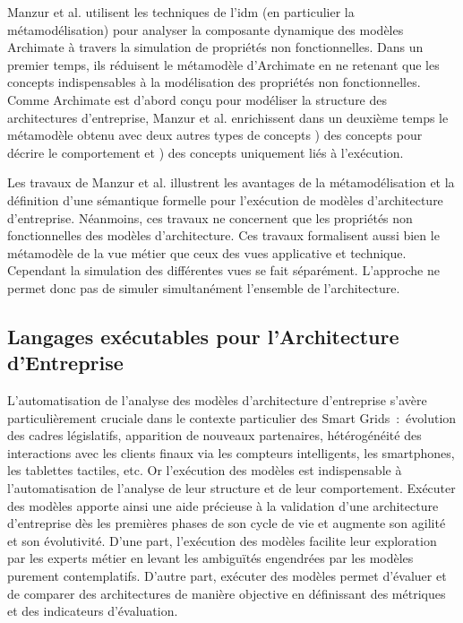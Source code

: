Manzur et al. \cite{manzur2015xarchimate} utilisent les techniques de l'\gls{idm} (en particulier la métamodélisation) pour analyser la composante dynamique des modèles Archimate à travers la simulation de propriétés non fonctionnelles. Dans un premier temps, ils réduisent le métamodèle  d'Archimate en ne retenant que les concepts indispensables à la modélisation des propriétés non fonctionnelles. Comme Archimate est d'abord conçu pour modéliser la structure des architectures d'entreprise, Manzur et al. \cite{manzur2015xarchimate} enrichissent dans un deuxième temps le métamodèle obtenu avec deux autres types de concepts \primo\!) des concepts pour décrire le comportement et \secundo\!) des concepts uniquement liés à l'exécution. 

Les travaux de Manzur et al. \cite{manzur2015xarchimate} illustrent les avantages de la métamodélisation et la définition d'une sémantique formelle pour l'exécution de modèles d'architecture d'entreprise. Néanmoins, ces travaux ne concernent que les propriétés non fonctionnelles des modèles d'architecture. Ces travaux formalisent aussi bien le métamodèle de la vue métier que ceux des vues applicative et technique. Cependant la simulation des différentes vues se fait séparément. L'approche ne permet donc pas de simuler simultanément l'ensemble de l'architecture. 



\subsection{Langages exécutables pour l'Architecture d'Entreprise}
\label{sec:executables_languages_ea}

L'automatisation de l'analyse des modèles d'architecture d'entreprise s'avère particulièrement cruciale dans le contexte particulier des Smart Grids~:~évolution des cadres législatifs,  apparition de nouveaux partenaires, hétérogénéité des interactions avec les clients finaux via les compteurs intelligents, les smartphones, les tablettes tactiles, etc. Or l'exécution des modèles est indispensable à l'automatisation de l'analyse de leur structure et de leur comportement. Exécuter des modèles apporte ainsi une aide précieuse à la validation d'une architecture d'entreprise dès les premières phases de son cycle de vie et augmente son agilité et son évolutivité. D'une part, l'exécution des modèles facilite leur exploration  par les experts métier en levant les ambiguïtés engendrées par les modèles purement contemplatifs. D'autre part, exécuter des modèles permet d'évaluer et de comparer des architectures de manière objective en définissant des métriques et des indicateurs d'évaluation. 

